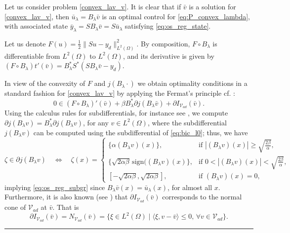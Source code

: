 \documentclass[11pt,a4paper]{amsart}
\newcommand{\kw}{\rule{2mm}{2mm}}
\newcommand{\om}{\Omega}
\newcommand{\sign}{\mathrm{sign}}
\renewenvironment{proof}{{Proof.}}{\hfill\kw}
\newcommand{\norm}[1]{\lVert #1 \rVert}
\begin{document}
\begin{proof} Let us consider problem \eqref{convex_lav_v}.	It is clear that if $\bar v $ is a solution for \eqref{convex_lav_v}, then $\bar u_\lambda=B_\lambda \bar v$ is an optimal control for \eqref{eq:P_convex_lambda}, with associated state $\bar y_\lambda = S B_\lambda \bar v = S \bar u_\lambda$ satisfying \eqref{eq:os_reg_state}. 

Let us denote $F(u) = \frac{1}{2}\norm{Su-y_d}^2_{L^2(\om)}$. By composition, $F\circ B_\lambda$ is differentiable from $L^2(\om)$ to $L^2(\om)$, and its derivative is given by $(F\circ B_\lambda)t'(\bar v) = B_\lambda^*S^*(SB_\lambda \bar v -y_d)$. 

In view of the convexity of $F$ and $j(B_\lambda \cdot)$  we obtain optimality conditions in a standard fashion for \eqref{convex_lav_v}  by applying the Fermat's principle cf. \cite{Bauschke_2017}:
\begin{equation}\label{eq:Fermat} 0 \in (F\circ B_\lambda)'(\bar v) + \beta B_\lambda^*\partial j(B_\lambda \bar v) + \partial I_{\mathcal{V}_{ad}}(\bar v).
\end{equation}	
%
Using the  calculus rules for subdifferentials, for instance see \cite{Bauschke_2017}, we compute  $\partial j(B_{\lambda}v)=B_{\lambda}^*\partial j(B_{\lambda} v)$, for any $v\in L^{2}(\Omega)$, where the subdifferential  $j(B_{\lambda} v)$ can be computed using the subdifferential of \eqref{eq:bic_l0}; thus, we have
$$\zeta \in \partial j(B_{\lambda} v) \quad \Leftrightarrow \quad \zeta(x)
=
\begin{cases} 
\{\alpha(B_{\lambda} v)(x) \}, & \text{if } |(B_{\lambda} v)(x)| \geq \sqrt{\frac{2\beta}{\alpha}}, \\
\{\sqrt{2 \alpha \beta} \, \sign((B_{\lambda} v)(x)\}, & \text{if } 0<|(B_{\lambda} v)(x)| < \sqrt{\frac{2\beta}{\alpha}}, \\
[-\sqrt{2 \alpha \beta},\sqrt{2 \alpha \beta}], & \text{if } (B_{\lambda} v)(x)=0,
\end{cases} 
$$
implying \eqref{eq:os_reg_subgr} since $B_\lambda \bar v(x) =\bar u_\lambda(x)$, for almost all $x$.
Furthermore, it is also known (see \cite{combettes2018}) that $\partial I_{\mathcal{V}_{ad}}(\bar v)$ corresponds to the normal cone of $\mathcal{V}_{ad}$ at $\bar v$. That is
\begin{equation}\label{def:normal_cones}
    \partial I_{\mathcal{V}_{ad}}(\bar v)=N_{\mathcal{V}_{ad}}(\bar{v}) = \{ \xi \in L^2(\om) \mid \langle \xi, v - \bar{v} \rangle \leq 0, \, \forall v \in \mathcal{V}_{ad} \}.

\end{equation}
\end{proof}
\end{document}
